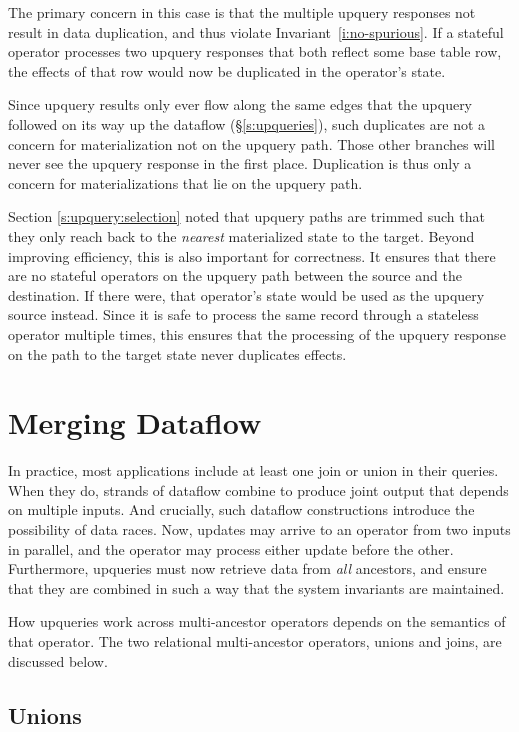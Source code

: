 The primary concern in this case is that the multiple upquery responses not
result in data duplication, and thus violate Invariant~\ref{i:no-spurious}. If a
stateful operator processes two upquery responses that both reflect some base
table row, the effects of that row would now be duplicated in the operator's
state.

Since upquery results only ever flow along the same edges that the upquery
followed on its way up the dataflow (\S\ref{s:upqueries}), such duplicates are
not a concern for materialization not on the upquery path. Those other branches
will never see the upquery response in the first place. Duplication is thus only
a concern for materializations that lie on the upquery path.

Section \ref{s:upquery:selection} noted that upquery paths are trimmed such that
they only reach back to the \emph{nearest} materialized state to the target.
Beyond improving efficiency, this is also important for correctness. It ensures
that there are no stateful operators on the upquery path between the source and
the destination. If there were, that operator's state would be used as the
upquery source instead. Since it is safe to process the same record through a
stateless operator multiple times, this ensures that the processing of the
upquery response on the path to the target state never duplicates effects.

\section{Merging Dataflow}

In practice, most applications include at least one join or union in their
queries. When they do, strands of dataflow combine to produce joint output that
depends on multiple inputs. And crucially, such dataflow constructions introduce
the possibility of data races. Now, updates may arrive to an operator from two
inputs in parallel, and the operator may process either update before the other.
Furthermore, upqueries must now retrieve data from \emph{all} ancestors, and
ensure that they are combined in such a way that the system invariants are
maintained.

How upqueries work across multi-ancestor operators depends on the semantics of
that operator. The two relational multi-ancestor operators, unions and joins,
are discussed below.

\subsection{Unions}
\label{s:upqueries:union}

